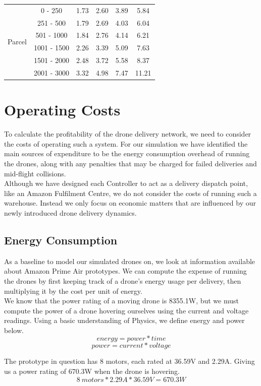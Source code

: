 \documentclass[a4paper,11pt,titlepage]{report}
\begin{document}
\begin{table}[!hbpt]
\begin{tabular}{|c|c|c|c|c|c|}
\multirow{6}{*}{Parcel} & 0 - 250 & 1.73 & 2.60 & 3.89 & 5.84 \\ \cline{2-6}
 & 251 - 500 & 1.79 & 2.69 & 4.03 & 6.04 \\ \cline{2-6}
 & 501 - 1000 & 1.84 & 2.76 & 4.14 & 6.21 \\ \cline{2-6}
 & 1001 - 1500 & 2.26 & 3.39 & 5.09 & 7.63 \\ \cline{2-6}
 & 1501 - 2000 & 2.48 & 3.72 & 5.58 & 8.37 \\ \cline{2-6}
 & 2001 - 3000 & 3.32 & 4.98 & 7.47 & 11.21 \\ \hline
\end{tabular}
\end{table}

\clearpage
\section{Operating Costs}
To calculate the profitability of the drone delivery network, we need to consider the costs of operating such a system. For our simulation we have identified the main sources of expenditure to be the energy consumption overhead of running the drones, along with any penalties that may be charged for failed deliveries and mid-flight collisions.\\

Although we have designed each Controller to act as a delivery dispatch point, like an Amazon Fulfilment Centre, we do not consider the costs of running such a warehouse. Instead we only focus on economic matters that are influenced by our newly introduced drone delivery dynamics.

\subsection{Energy Consumption}
As a baseline to model our simulated drones on, we look at information available about Amazon Prime Air prototypes. We can compute the expense of running the drones by first keeping track of a drone's energy usage per delivery, then multiplying it by the cost per unit of energy.\\

We know that the power rating of a moving drone is 8355.1W, but we must compute the power of a drone hovering ourselves using the current and voltage readings. Using a basic understanding of Physics, we define energy and power below.
$$energy = power * time$$
$$power = current * voltage$$

The prototype in question \cite{Jung2017} has 8 motors, each rated at 36.59V and 2.29A. Giving us a power rating of 670.3W when the drone is hovering.
$$ 8\ motors * 2.29A * 36.59V = 670.3W $$
\end{document}
